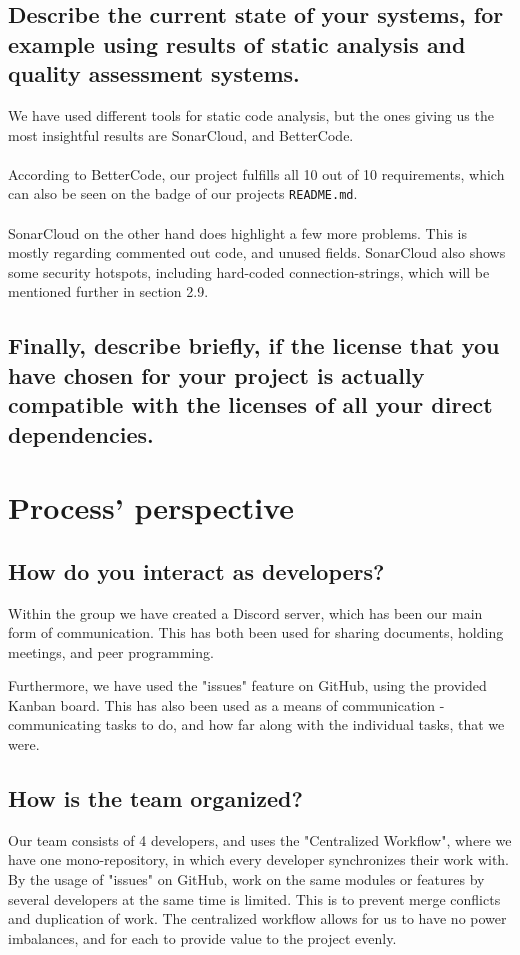 \documentclass{article}
\begin{document}
\subsection{Describe the current state of your systems, for example using results of static analysis and quality assessment systems.}
We have used different tools for static code analysis, but the ones giving us the most insightful results are SonarCloud, and BetterCode.
\\\\
According to BetterCode, our project fulfills all 10 out of 10 requirements, which can also be seen on the badge of our projects \verb|README.md|.
\\\\
SonarCloud on the other hand does highlight a few more problems. This is mostly regarding commented out code, and unused fields. SonarCloud also shows some security hotspots, including hard-coded connection-strings, which will be mentioned further in section 2.9.

\subsection{Finally, describe briefly, if the license that you have chosen for your project is actually compatible with the licenses of all your direct dependencies.}


\section{Process' perspective}

\subsection{How do you interact as developers?}
Within the group we have created a Discord server, which has been our main form of communication. This has both been used for sharing documents, holding meetings, and peer programming.

Furthermore, we have used the "issues" feature on GitHub, using the provided Kanban board. This has also been used as a means of communication - communicating tasks to do, and how far along with the individual tasks, that we were.

\subsection{How is the team organized?}
Our team consists of 4 developers, and uses the "Centralized Workflow", where we have one mono-repository, in which every developer synchronizes their work with. By the usage of "issues" on GitHub, work on the same modules or features by several developers at the same time is limited. This is to prevent merge conflicts and duplication of work. The centralized workflow allows for us to have no power imbalances, and for each to provide value to the project evenly.
\end{document}

